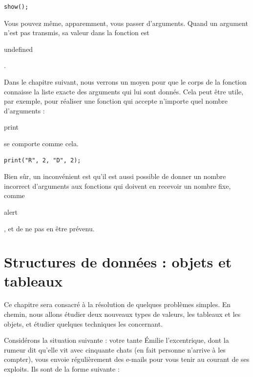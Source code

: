 \documentclass{FramateX}
\renewcommand{\texttt}[1]{\begin{sffamily}{#1}\end{sffamily}}
\begin{document}
\begin{lstlisting}
show();
\end{lstlisting}
Vous pouvez même, apparemment, vous passer d'arguments. Quand un
argument n'est pas transmis, sa valeur dans la fonction est
\texttt{undefined}.

Dans le chapitre suivant, nous verrons un moyen pour que le corps de la
fonction connaisse la liste exacte des arguments qui lui sont donnés.
Cela peut être utile, par exemple, pour réaliser une fonction qui
accepte n'importe quel nombre d'arguments : \texttt{print} se comporte
comme cela.

\begin{lstlisting}
print("R", 2, "D", 2);
\end{lstlisting}
Bien sûr, un inconvénient est qu'il est aussi possible de donner un
nombre incorrect d'arguments aux fonctions qui doivent en recevoir un
nombre fixe, comme \texttt{alert}, et de ne pas en être prévenu.


\chapter{Structures de données : objets et tableaux}

Ce chapitre sera consacré à la résolution de quelques problèmes simples.
En chemin, nous allons étudier deux nouveaux types de valeurs, les
tableaux et les objets, et étudier quelques techniques les concernant.

Considérons la situation suivante : votre tante Émilie l'excentrique,
dont la rumeur dit qu'elle vit avec cinquante chats (en fait personne
n'arrive à les compter), vous envoie régulièrement des e-mails pour vous
tenir au courant de ses exploits. Ils sont de la forme suivante :
\end{document}
